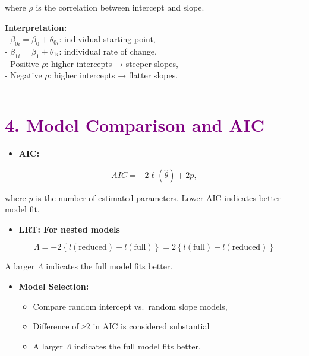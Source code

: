 \documentclass[
  letterpaper,
  DIV=11,
  numbers=noendperiod]{scrreprt}
\providecommand{\tightlist}{%
  \setlength{\itemsep}{0pt}\setlength{\parskip}{0pt}}\usepackage{longtable,booktabs,array}
\begin{document}
where \(\rho\) is the correlation between intercept and slope.

\textbf{Interpretation:}\\
- \(\beta_{0i} = \beta_0 + \theta_{0i}\): individual starting point,\\
- \(\beta_{1i} = \beta_1 + \theta_{1i}\): individual rate of change,\\
- Positive \(\rho\): higher intercepts → steeper slopes,\\
- Negative \(\rho\): higher intercepts → flatter slopes.

\begin{center}\rule{0.5\linewidth}{0.5pt}\end{center}

\hypertarget{section-6}{%
\section*{\texorpdfstring{\textcolor{purple}{4. Model Comparison and AIC}}{}}\label{section-6}}

\markright{\textcolor{purple}{4. Model Comparison and AIC}}

\begin{itemize}
\tightlist
\item
  \textbf{AIC:}
\end{itemize}

\[
  AIC = -2 \ell(\hat{\theta}) + 2p,
\]

where \(p\) is the number of estimated parameters. Lower AIC indicates
better model fit.

\begin{itemize}
\tightlist
\item
  \textbf{LRT: For nested models}
\end{itemize}

\[
\Lambda = -2 \left\{l(\text{reduced}) - l(\text{full})\right\} = 2\left\{l(\text{full}) - l(\text{reduced})\right\}
\]

A larger \(\Lambda\) indicates the full model fits better.

\begin{itemize}
\tightlist
\item
  \textbf{Model Selection:}

  \begin{itemize}
  \tightlist
  \item
    Compare random intercept vs.~random slope models,
  \item
    Difference of ≥2 in AIC is considered substantial
  \item
    A larger \(\Lambda\) indicates the full model fits better.
  \end{itemize}
\end{itemize}
\end{document}
